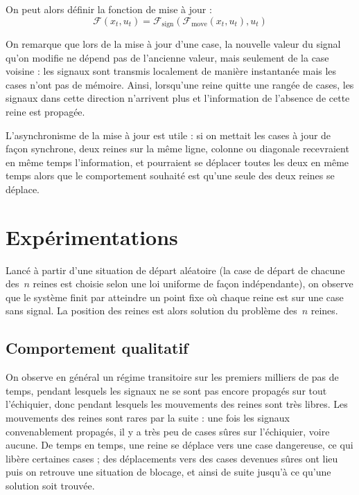 \noindent
On peut alors définir la fonction de mise à jour : $$\mathcal{F}(x_t, u_t) = \mathcal{F}_{\mathrm{sign}}(\mathcal{F}_{\mathrm{move}}(x_t, u_t), u_t)$$


On remarque que lors de la mise à jour d'une case, la nouvelle valeur du signal qu'on modifie ne dépend pas de l'ancienne valeur, mais seulement de la case voisine : les signaux sont transmis localement de manière instantanée mais les cases n'ont pas de mémoire. Ainsi, lorsqu'une reine quitte une rangée de cases, les signaux dans cette direction n'arrivent plus et l'information de l'absence de cette reine est propagée. 

L'asynchronisme de la mise à jour est utile : si on mettait les cases à jour de façon synchrone, deux reines sur la même ligne, colonne ou diagonale recevraient en même temps l'information, et pourraient se déplacer toutes les deux en même temps alors que le comportement souhaité est qu'une seule des deux reines se déplace. 










\section{Expérimentations}


Lancé à partir d'une situation de départ aléatoire (la case de départ de chacune des~$n$ reines est choisie selon une loi uniforme de façon indépendante), on observe que le système finit par atteindre un point fixe où chaque reine est sur une case sans signal. La position des reines est alors solution du problème des~$n$ reines.

\subsection{Comportement qualitatif}

On observe en général un régime transitoire sur les premiers milliers de pas de temps, pendant lesquels les signaux ne se sont pas encore propagés sur tout l'échiquier, donc pendant lesquels les mouvements des reines sont très libres. %
Les mouvements des reines sont rares par la suite : une fois les signaux convenablement propagés, il y a très peu de cases sûres sur l'échiquier, voire aucune. De temps en temps, une reine se déplace vers une case dangereuse, ce qui libère certaines cases ; des déplacements vers des cases devenues sûres ont lieu puis on retrouve une situation de blocage, et ainsi de suite jusqu'à ce qu'une solution soit trouvée.

